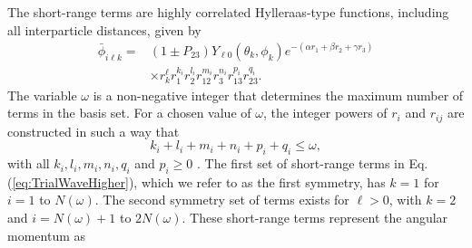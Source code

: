 \documentclass[preprint,showpacs,showkeys,preprintnumbers,amsmath,amssymb,longbibliography,pra,aps]{revtex4-1}
\newcommand{\todoi}{\todo[inline]}
\begin{document}
The short-range terms are highly correlated Hylleraas-type functions, including
all interparticle distances, given by
\begin{align}
\label{eq:PhiDef}
\bar{\phi}_{i\ell k} = &\left(1 \pm P_{23}\right) Y_{\ell 0}(\theta_k,\phi_k)
e^{-(\alpha r_1 + \beta r_2 + \gamma r_3)} \nonumber \\
&\times r_k^{\ell} r_1^{k_i} r_2^{l_i} r_{12}^{m_i} r_3^{n_i} r_{13}^{p_i} r_{23}^{q_i}.
\end{align}
The variable $\omega$ is a non-negative integer that determines the maximum
number of terms in the basis set. For a chosen value of $\omega$, the integer
powers of $r_i$ and $r_{ij}$ are constructed in such a way that 
\begin{equation}
k_i + l_i + m_i + n_i + p_i + q_i \leq \omega,
\end{equation}
with all $k_i, l_i, m_i, n_i, q_i$ and $p_i \geq 0$ \cite{VanReeth2004}.
The first set of short-range terms in Eq. (\ref{eq:TrialWaveHigher}), which we
refer to as the first symmetry, has $k=1$ for $i=1$ to $N(\omega)$. The second
symmetry set of terms exists for $\ell > 0$, with $k=2$ and $i = N(\omega)+1$
to $2N(\omega)$. These short-range terms represent the angular momentum as
\end{document}
